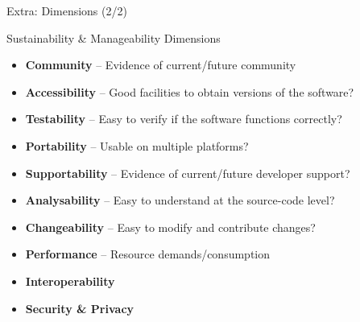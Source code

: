 \documentclass[compress]{beamer}
\begin{document}
\begin{frame}{Extra: Dimensions (2/2)}
    \begin{block}{Sustainability \& Manageability Dimensions}
        \begin{itemize}    
            \item \textbf{Community} -- Evidence of current/future community
            \item \textbf{Accessibility} -- Good facilities to obtain versions of the software?
            \item \textbf{Testability} -- Easy to verify if the software functions correctly?
            \item \textbf{Portability} -- Usable on multiple platforms?
            \item \textbf{Supportability} -- Evidence of current/future developer support?
            \item \textbf{Analysability} -- Easy to understand at the source-code level?
            \item \textbf{Changeability} -- Easy to modify and contribute changes? 
            \item \textbf{Performance} -- Resource demands/consumption
            \item \textbf{Interoperability} 
            \item \textbf{Security \& Privacy}
        \end{itemize}
    \end{block}
\end{frame}
\end{document}
